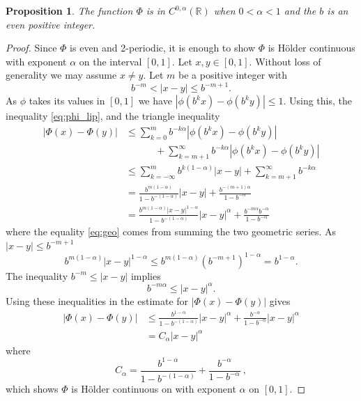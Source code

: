 \documentclass[12pt]{amsart}
\numberwithin{equation}{section}
\newcommand{\R}{{\mathbb R}}		%
\newtheorem{prop}[thm]{Proposition}
\theoremstyle{definition}
\theoremstyle{remark}
\begin{document}
\begin{prop}\label{prop:C-alpha} 
  The function $\Phi$ is in $C^{0,\alpha}(\R)$ when $0<\alpha<1$
  and the  $b$ is an even positive integer.
\end{prop}

\begin{proof}
  Since $\Phi$ is even and 2-periodic,
   it is enough to show $\Phi$ is  
   H\"older continuous with exponent $\alpha$
   on the interval $[0,1]$.  Let $x,y\in [0,1]$.
    Without loss of generality we may assume $x\ne y$.  
    Let $m$ be a positive integer with
    $$
    b^{-m} < |x-y| \le b^{-m+1}.
    $$
    As $\phi$ takes its values in $[0,1]$  we have
    $|\phi(b^kx)-\phi(b^ky)|\le 1$. Using this,
    the inequality \eqref{eq:phi_lip}, and the triangle inequality
    \begin{align}\nonumber
        | \Phi(x) - \Phi(y)|&\le \sum_{k=0}^{m} b^{-k\alpha}|\phi(b^kx) - \phi(b^ky)|\\
            &\qquad\quad  +\sum_{k=m+1}^\infty b^{-k\alpha}|\phi(b^kx) - \phi(b^ky)|\nonumber\\
            &\le \sum_{k=-\infty}^m b^{k(1-\alpha)}|x-y| + \sum_{k=m+1}^\infty b^{-k\alpha}\nonumber\\
        \label{eq:geo}           &= \frac{b^{m(1-\alpha)}}{1-b^{-(1-\alpha)}} |x-y| + \frac{b^{-(m+1)\alpha}}{1-b^{-\alpha}}\\
                                 &= \frac{b^{m(1-\alpha)}|x-y|^{1-\alpha}}{1-b^{-(1-\alpha)}} |x-y|^\alpha + \frac{b^{-m\alpha}b^{-\alpha}}{1-b^{-\alpha} }\nonumber
\end{align}
where the equality \eqref{eq:geo} comes from summing the two geometric series.
As $|x-y|\le b^{-m+1}$ 
$$
b^{m(1-\alpha)}|x-y|^{1-\alpha}\le b^{m(1-\alpha)}( b^{-m+1})^{1-\alpha}
= b^{1-\alpha}.
$$
The inequality $b^{-m}\le |x-y|$ implies
$$
b^{-m\alpha}\le |x-y|^\alpha.
$$
Using these inequalities in the estimate for $|\Phi(x)-\Phi(y)|$
gives
\begin{align*}
    |\Phi(x)-\Phi(y)|&\le  \frac{b^{1-\alpha}}{1-b^{-(1-\alpha)}} |x-y|^\alpha + \frac{b^{-\alpha}}{1-b^{-\alpha} }|x-y|^\alpha\\
                      &= C_\alpha |x-y|^\alpha
\end{align*}
where 
$$
C_\alpha =  \frac{b^{1-\alpha}}{1-b^{-(1-\alpha)}} +  \frac{b^{-\alpha}}{1-b^{-\alpha} }~,
$$
which shows $\Phi$ is H\"older continuous on with exponent $\alpha$ on $[0,1]$.
\end{proof}
\end{document}
